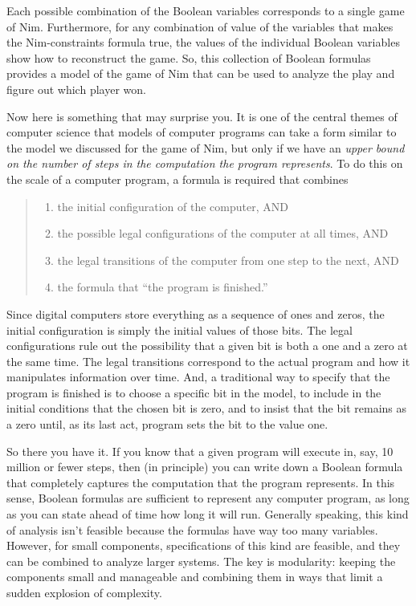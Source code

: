 {{Each possible combination of the Boolean variables
corresponds to a single game of Nim.
Furthermore, for any combination of value of the variables that makes the
Nim-constraints formula true, the values of the individual Boolean variables
show how to reconstruct the game.
So, this collection of Boolean formulas provides a model of the game of Nim
that can be used to analyze the play and figure out which player won.

Now here is something that may surprise you.
It is one of the central themes of computer science
that models of computer programs can take a form
similar to the model we discussed for the game of Nim,
but only if we have an \emph{upper bound on the number of
steps in the computation the program represents}.
To do this on the scale of a computer program,
a formula is required that combines
\begin{quote}
\begin{enumerate}
\item the initial configuration of the computer, AND
\item the possible legal configurations of the computer at all times, AND
\item the legal transitions of the computer from one step to the next, AND
\item the formula that ``the program is finished.''
\end{enumerate}
\end{quote}

Since digital computers store everything as a sequence of ones and zeros,
the initial configuration is simply the initial values of those bits.
The legal configurations rule out the possibility that a given bit is both a
one and a zero at the same time.
The legal transitions correspond to the actual program and how it manipulates information
over time. And, a traditional way to specify that the program is finished
is to choose a specific bit in the model, to include in the initial conditions
that the chosen bit is zero, and to insist that
the bit remains as a zero until, as its last act,
program sets the bit to the value one.

So there you have it.
If you know that a given program will execute in, say, 10 million or fewer steps,
then (in principle) you can
write down a Boolean formula that completely captures the computation
that the program represents.
In this sense, Boolean formulas are sufficient to
represent any computer program,
as long as you can state ahead of time how long it will run.
Generally speaking, this kind of analysis isn't feasible
because the formulas have way too many variables.
However, for small components,
specifications of this kind are feasible, and they can be combined
to analyze larger systems. The key is modularity: keeping the
components small and manageable and combining them in
ways that limit a sudden explosion of complexity.

}}
